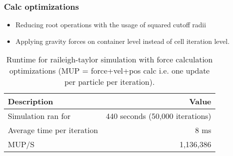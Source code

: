\begin{frame}
    \frametitle{Calc optimizations}
    \begin{itemize}
        \item Reducing root operations with the usage of squared cutoff radii
        \item Applying gravity forces on container level instead of cell iteration level.
    \end{itemize}
    \begin{table}[h!]
        \centering
        \begin{tabular}{|l|r|}
            \hline
            \textbf{Description} & \textbf{Value} \\ \hline
            Simulation ran for & 440 seconds (50,000 iterations) \\ \hline
            Average time per iteration & 8 ms \\ \hline
            MUP/S & 1,136,386 \\ \hline
        \end{tabular}
        \caption{Runtime for raileigh-taylor simulation with force calculation optimizations (MUP = force+vel+pos calc i.e. one update per particle per iteration).}
        \label{table:raileigh_calc}
    \end{table}
\end{frame}
